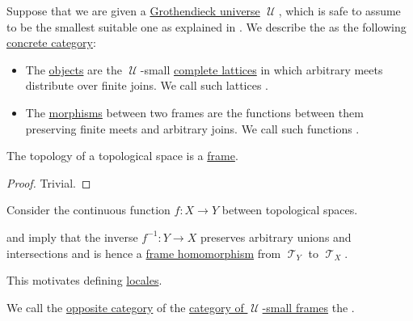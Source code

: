 \begin{definition}\label{def:category_of_small_frames}
  Suppose that we are given a \hyperref[def:grothendieck_universe]{Grothendieck universe} \( \mscrU \), which is safe to assume to be the smallest suitable one as explained in . We describe the  as the following \hyperref[rem:concrete_categories]{concrete category}:

  \begin{itemize}
    \item The \hyperref[def:category/objects]{objects} are the \( \mscrU \)-small \hyperref[def:complete_lattice]{complete lattices} in which arbitrary meets distribute over finite joins. We call such lattices .

    \item The \hyperref[def:category/morphisms]{morphisms} between two frames are the functions between them preserving finite meets and arbitrary joins. We call such functions .
  \end{itemize}
\end{definition}

\begin{proposition}\label{thm:topological_spaces_are_frames}
  The topology of a topological space is a \hyperref[def:category_of_small_frames]{frame}.
\end{proposition}
\begin{proof}
  Trivial.
\end{proof}

\begin{remark}\label{rem:topology_frame_homomorphism}
  Consider the continuous function \( f: X \to Y \) between topological spaces.

   and  imply that the inverse \( f^{-1}: Y \to X \) preserves arbitrary unions and intersections and is hence a \hyperref[def:category_of_small_frames]{frame homomorphism} from \( \mscrT_Y \) to \( \mscrT_X \).

  This motivates defining \hyperref[def:category_of_small_locales]{locales}.
\end{remark}

\begin{definition}\label{def:category_of_small_locales}
  We call the \hyperref[def:opposite_category]{opposite category} of the \hyperref[def:category_of_small_frames]{category of \( \mscrU \)-small frames} the .
\end{definition}

